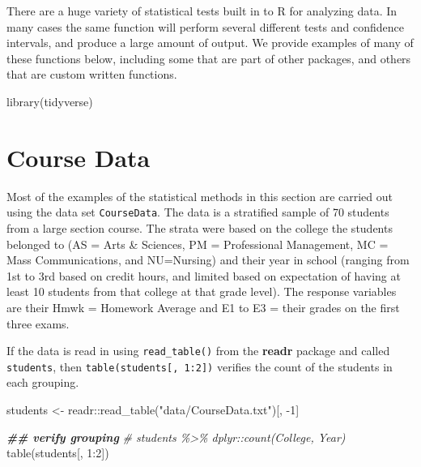 \documentclass[
]{book}
\newenvironment{Shaded}{\begin{snugshade}}{\end{snugshade}}
\newcommand{\CommentTok}[1]{\textcolor[rgb]{0.56,0.35,0.01}{\textit{#1}}}
\newcommand{\DecValTok}[1]{\textcolor[rgb]{0.00,0.00,0.81}{#1}}
\newcommand{\DocumentationTok}[1]{\textcolor[rgb]{0.56,0.35,0.01}{\textbf{\textit{#1}}}}
\newcommand{\FunctionTok}[1]{\textcolor[rgb]{0.00,0.00,0.00}{#1}}
\newcommand{\NormalTok}[1]{#1}
\newcommand{\OtherTok}[1]{\textcolor[rgb]{0.56,0.35,0.01}{#1}}
\newcommand{\SpecialCharTok}[1]{\textcolor[rgb]{0.00,0.00,0.00}{#1}}
\newcommand{\StringTok}[1]{\textcolor[rgb]{0.31,0.60,0.02}{#1}}
\begin{document}
There are a huge variety of statistical tests built in to R for analyzing data. In many cases the same function will perform several different tests and confidence intervals, and produce a large amount of output. We provide examples of many of these functions below, including some that are part of other packages, and others that are custom written functions.

\begin{Shaded}
\begin{Highlighting}[]
\FunctionTok{library}\NormalTok{(tidyverse)}
\end{Highlighting}
\end{Shaded}

\hypertarget{course-data}{%
\section*{Course Data}\label{course-data}}

Most of the examples of the statistical methods in this section are carried out using the data set \texttt{CourseData}. The data is a stratified sample of 70 students from a large section course. The strata were based on the college the students belonged to (AS = Arts \& Sciences, PM = Professional Management, MC = Mass Communications, and NU=Nursing) and their year in school (ranging from 1st to 3rd based on credit hours, and limited based on expectation of having at least 10 students from that college at that grade level). The response variables are their Hmwk = Homework Average and E1 to E3 = their grades on the first three exams.

If the data is read in using \texttt{read\_table()} from the \textbf{readr} package and called \texttt{students}, then \texttt{table(students{[},\ 1:2{]})} verifies the count of the students in each grouping.

\begin{Shaded}
\begin{Highlighting}[]
\NormalTok{students }\OtherTok{\textless{}{-}}\NormalTok{ readr}\SpecialCharTok{::}\FunctionTok{read\_table}\NormalTok{(}\StringTok{"data/CourseData.txt"}\NormalTok{)[, }\SpecialCharTok{{-}}\DecValTok{1}\NormalTok{]}

\DocumentationTok{\#\# verify grouping}
\CommentTok{\# students \%\textgreater{}\% dplyr::count(College, Year)}
\FunctionTok{table}\NormalTok{(students[, }\DecValTok{1}\SpecialCharTok{:}\DecValTok{2}\NormalTok{])}
\end{Highlighting}
\end{Shaded}
\end{document}

